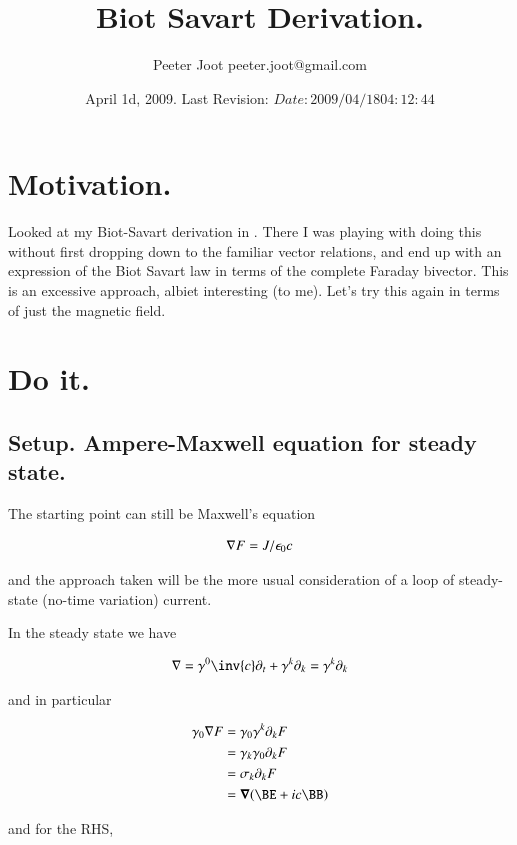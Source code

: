 \documentclass{article}
\title{ Biot Savart Derivation. }
\author{Peeter Joot \quad peeter.joot@gmail.com }
\date{ April 1d, 2009.  Last Revision: $Date: 2009/04/18 04:12:44 $ }
\begin{document}
\maketitle{}
\tableofcontents
\section{ Motivation. }

Looked at my Biot-Savart derivation in \cite{PJelectricFieldEnergy}.  There I was playing with doing this without first dropping down to the
familiar vector relations, and end up with an expression of the Biot Savart law in terms of the complete Faraday bivector.  This is
an excessive approach, albiet interesting (to me).  Let's try this again in terms of just the magnetic field.

\section{ Do it. }

\subsection{ Setup. Ampere-Maxwell equation for steady state. }

The starting point can still be Maxwell's equation

\begin{align}
\nabla F = J/\epsilon_0 c
\end{align}

and the approach taken will be the more usual consideration of a loop of steady-state (no-time variation) current.

In the steady state we have

\begin{align*}
\grad = \gamma^0 \inv{c} \partial_t + \gamma^k \partial_k = \gamma^k \partial_k
\end{align*}

and in particular 

\begin{align*}
\gamma_0 \grad F 
&= \gamma_0 \gamma^k \partial_k F \\
&= \gamma_k \gamma_0 \partial_k F \\
&= \sigma_k \partial_k F \\
&= \spacegrad (\BE + i c \BB) \\
\end{align*}

and for the RHS,
\end{document}
